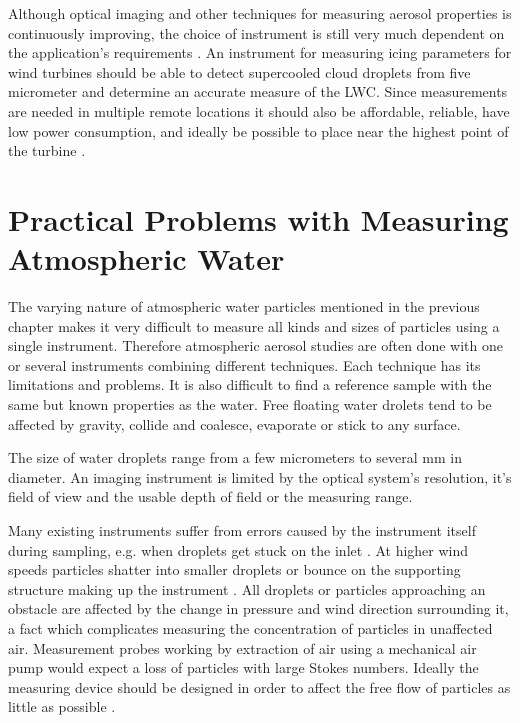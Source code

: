 Although optical imaging and other techniques for measuring aerosol properties is continuously improving, the choice of instrument is still very much dependent on the application’s requirements \cite{ide1999, baum1983, baum2011, kulk2011}. An instrument for measuring icing parameters for wind turbines should be able to detect supercooled cloud droplets from five micrometer and determine an accurate measure of the LWC. Since measurements are needed in multiple remote locations it should also be affordable, reliable, have low power consumption, and ideally be possible to place near the highest point of the turbine \cite{homo2006}.

\section{Practical Problems with Measuring Atmospheric Water}

The varying nature of atmospheric water particles mentioned in the previous chapter makes it very difficult to measure all kinds and sizes of particles using a single instrument. Therefore atmospheric aerosol studies are often done with one or several instruments combining different techniques. Each technique has its limitations and problems. It is also difficult to find a reference sample with the same but known properties as the water. Free floating water drolets tend to be affected by gravity, collide and coalesce, evaporate or stick to any surface. 

The size of water droplets range from a few micrometers to several mm in diameter. An imaging instrument is limited by the optical system's resolution, it's field of view and the usable depth of field or the measuring range.

Many existing instruments suffer from errors caused by the instrument itself during sampling, e.g. when droplets get stuck on the inlet \cite{spie2012}. At higher wind speeds particles shatter into smaller droplets or bounce on the supporting structure making up the instrument \cite{cohen1991,field2006}. All droplets or particles approaching an obstacle are affected by the change in pressure and wind direction surrounding it, a fact which complicates measuring the concentration of particles in unaffected air. Measurement probes working by extraction of air using a mechanical air pump would expect a loss of particles with large Stokes numbers. Ideally the measuring device should be designed in order to affect the free flow of particles as little as possible \cite{baum2011}.

